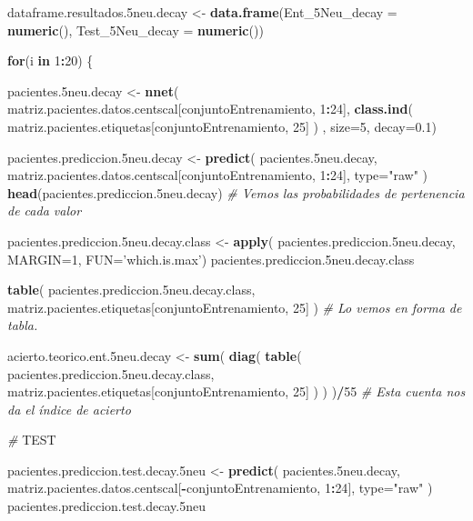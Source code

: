 \documentclass[]{article}
\newenvironment{Shaded}{\begin{snugshade}}{\end{snugshade}}
\newcommand{\KeywordTok}[1]{\textcolor[rgb]{0.13,0.29,0.53}{\textbf{#1}}}
\newcommand{\DataTypeTok}[1]{\textcolor[rgb]{0.13,0.29,0.53}{#1}}
\newcommand{\DecValTok}[1]{\textcolor[rgb]{0.00,0.00,0.81}{#1}}
\newcommand{\FloatTok}[1]{\textcolor[rgb]{0.00,0.00,0.81}{#1}}
\newcommand{\StringTok}[1]{\textcolor[rgb]{0.31,0.60,0.02}{#1}}
\newcommand{\CommentTok}[1]{\textcolor[rgb]{0.56,0.35,0.01}{\textit{#1}}}
\newcommand{\ControlFlowTok}[1]{\textcolor[rgb]{0.13,0.29,0.53}{\textbf{#1}}}
\newcommand{\OperatorTok}[1]{\textcolor[rgb]{0.81,0.36,0.00}{\textbf{#1}}}
\newcommand{\AlertTok}[1]{\textcolor[rgb]{0.94,0.16,0.16}{#1}}
\newcommand{\NormalTok}[1]{#1}
\begin{document}
\begin{Shaded}
\begin{Highlighting}[]
\NormalTok{dataframe.resultados.5neu.decay <-}\StringTok{ }\KeywordTok{data.frame}\NormalTok{(}\DataTypeTok{Ent_5Neu_decay =} \KeywordTok{numeric}\NormalTok{(),}
                                              \DataTypeTok{Test_5Neu_decay =} \KeywordTok{numeric}\NormalTok{())}

\ControlFlowTok{for}\NormalTok{(i }\ControlFlowTok{in} \DecValTok{1}\OperatorTok{:}\DecValTok{20}\NormalTok{)}
\NormalTok{\{}

\NormalTok{  pacientes.5neu.decay <-}\StringTok{ }\KeywordTok{nnet}\NormalTok{( matriz.pacientes.datos.centscal[conjuntoEntrenamiento, }\DecValTok{1}\OperatorTok{:}\DecValTok{24}\NormalTok{], }\KeywordTok{class.ind}\NormalTok{( matriz.pacientes.etiquetas[conjuntoEntrenamiento, }\DecValTok{25}\NormalTok{] ) , }\DataTypeTok{size=}\DecValTok{5}\NormalTok{, }\DataTypeTok{decay=}\FloatTok{0.1}\NormalTok{)}
  
\NormalTok{  pacientes.prediccion.5neu.decay <-}\StringTok{ }\KeywordTok{predict}\NormalTok{( pacientes.5neu.decay, matriz.pacientes.datos.centscal[conjuntoEntrenamiento, }\DecValTok{1}\OperatorTok{:}\DecValTok{24}\NormalTok{], }\DataTypeTok{type=}\StringTok{"raw"}\NormalTok{ )}
  \KeywordTok{head}\NormalTok{(pacientes.prediccion.5neu.decay) }\CommentTok{# Vemos las probabilidades de pertenencia de cada valor}
  
\NormalTok{  pacientes.prediccion.5neu.decay.class <-}\StringTok{ }\KeywordTok{apply}\NormalTok{( pacientes.prediccion.5neu.decay, }\DataTypeTok{MARGIN=}\DecValTok{1}\NormalTok{, }\DataTypeTok{FUN=}\StringTok{'which.is.max'}\NormalTok{)}
\NormalTok{  pacientes.prediccion.5neu.decay.class}
  
  \KeywordTok{table}\NormalTok{( pacientes.prediccion.5neu.decay.class, matriz.pacientes.etiquetas[conjuntoEntrenamiento, }\DecValTok{25}\NormalTok{] )  }\CommentTok{# Lo vemos en forma de tabla.}
  
\NormalTok{  acierto.teorico.ent.5neu.decay <-}\StringTok{ }\KeywordTok{sum}\NormalTok{( }\KeywordTok{diag}\NormalTok{( }\KeywordTok{table}\NormalTok{( pacientes.prediccion.5neu.decay.class, matriz.pacientes.etiquetas[conjuntoEntrenamiento, }\DecValTok{25}\NormalTok{] ) ) )}\OperatorTok{/}\DecValTok{55} \CommentTok{# Esta cuenta nos da el índice de acierto}
  
  \CommentTok{# }\AlertTok{TEST}
  
\NormalTok{  pacientes.prediccion.test.decay.5neu <-}\StringTok{ }\KeywordTok{predict}\NormalTok{( pacientes.5neu.decay, matriz.pacientes.datos.centscal[}\OperatorTok{-}\NormalTok{conjuntoEntrenamiento, }\DecValTok{1}\OperatorTok{:}\DecValTok{24}\NormalTok{], }\DataTypeTok{type=}\StringTok{"raw"}\NormalTok{ )}
\NormalTok{  pacientes.prediccion.test.decay.5neu}
  

\end{Highlighting}
\end{Shaded}
\end{document}
